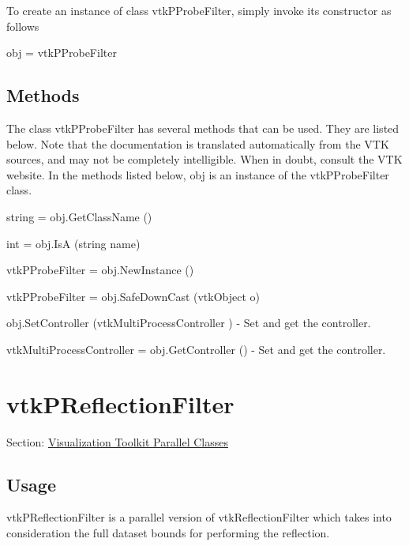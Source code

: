 To create an instance of class vtk\-P\-Probe\-Filter, simply invoke its constructor as follows \begin{DoxyVerb}  obj = vtkPProbeFilter
\end{DoxyVerb}
 \hypertarget{vtkwidgets_vtkxyplotwidget_Methods}{}\subsection{Methods}\label{vtkwidgets_vtkxyplotwidget_Methods}
The class vtk\-P\-Probe\-Filter has several methods that can be used. They are listed below. Note that the documentation is translated automatically from the V\-T\-K sources, and may not be completely intelligible. When in doubt, consult the V\-T\-K website. In the methods listed below, {\ttfamily obj} is an instance of the vtk\-P\-Probe\-Filter class. 
\begin{DoxyItemize}
\item {\ttfamily string = obj.\-Get\-Class\-Name ()}  
\item {\ttfamily int = obj.\-Is\-A (string name)}  
\item {\ttfamily vtk\-P\-Probe\-Filter = obj.\-New\-Instance ()}  
\item {\ttfamily vtk\-P\-Probe\-Filter = obj.\-Safe\-Down\-Cast (vtk\-Object o)}  
\item {\ttfamily obj.\-Set\-Controller (vtk\-Multi\-Process\-Controller )} -\/ Set and get the controller.  
\item {\ttfamily vtk\-Multi\-Process\-Controller = obj.\-Get\-Controller ()} -\/ Set and get the controller.  
\end{DoxyItemize}\hypertarget{vtkparallel_vtkpreflectionfilter}{}\section{vtk\-P\-Reflection\-Filter}\label{vtkparallel_vtkpreflectionfilter}
Section\-: \hyperlink{sec_vtkparallel}{Visualization Toolkit Parallel Classes} \hypertarget{vtkwidgets_vtkxyplotwidget_Usage}{}\subsection{Usage}\label{vtkwidgets_vtkxyplotwidget_Usage}
vtk\-P\-Reflection\-Filter is a parallel version of vtk\-Reflection\-Filter which takes into consideration the full dataset bounds for performing the reflection.

